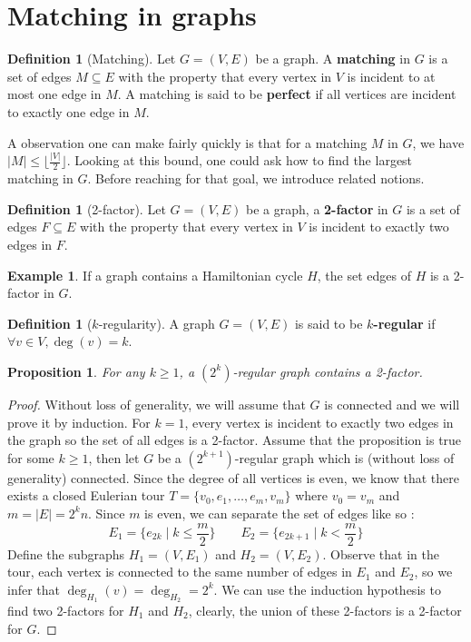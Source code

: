 \documentclass{tufte-handout}
\newtheorem{prop}[thm]{Proposition}
\theoremstyle{definition}
\newtheorem{defn}[thm]{Definition}
\newtheorem{exmp}[thm]{Example}
\theoremstyle{remark}
\begin{document}
\section{Matching in graphs}
\begin{defn}[Matching]
	Let $G = (V,E)$ be a graph. A \textbf{matching} in $G$ is a set of edges $M \subseteq E$ with the property that every vertex in $V$ is incident to at most one edge in $M$. A matching is said to be \textbf{perfect} if all vertices are incident to exactly one edge in $M$.
\end{defn}
A observation one can make fairly quickly is that for a matching $M$ in $G$, we have $|M| \leq \lfloor \frac{|V|}{2}\rfloor$. Looking at this bound, one could ask how to find the largest matching in $G$. Before reaching for that goal, we introduce related notions.
\begin{defn}[2-factor]
	Let $G = (V,E)$ be a graph, a \textbf{2-factor} in $G$ is a set of edges $F \subseteq E$  with the property that every vertex in $V$ is incident to exactly two edges in $F$.
\end{defn}
\begin{exmp}
	If a graph contains a Hamiltonian cycle $H$, the set edges of $H$ is a 2-factor in $G$.
\end{exmp}
\begin{defn}[$k$-regularity]
	A graph $G=(V,E)$ is said to be \textbf{$k$-regular} if $\forall v \in V,\deg(v) = k$.
\end{defn}
\begin{prop}
	For any $k\geq 1$, a $(2^k)$-regular graph contains a 2-factor.
\end{prop}
\begin{proof}
	Without loss of generality, we will assume that $G$ is connected and we will prove it by induction. For $k=1$, every vertex is incident to exactly two edges in the graph so the set of all edges is a 2-factor. Assume that the proposition is true for some $k\geq 1$, then let $G$ be a $(2^{k+1})$-regular graph which is (without loss of generality) connected. Since the degree of all vertices is even, we know that there exists a closed Eulerian tour $T = \{v_0, e_1, \dots, e_m, v_m\}$ where $v_0 = v_m$ and $m = |E| = 2^kn$. Since $m$ is even, we can separate the set of edges like so :
	$$ E_1 = \{e_{2k} \mid k \leq \frac{m}{2}\} \quad \quad E_2 = \{e_{2k+1} \mid k < \frac{m}{2}\}$$
	Define the subgraphs $H_1 = (V,E_1)$ and $H_2 = (V,E_2)$. Observe that in the tour, each vertex is connected to the same number of edges in $E_1$ and $E_2$, so we infer that $\deg_{H_1}(v) = \deg_{H_2} = 2^k$. We can use the induction hypothesis to find two 2-factors for $H_1$ and $H_2$, clearly, the union of these 2-factors is a 2-factor for $G$.
\end{proof}
\end{document}
